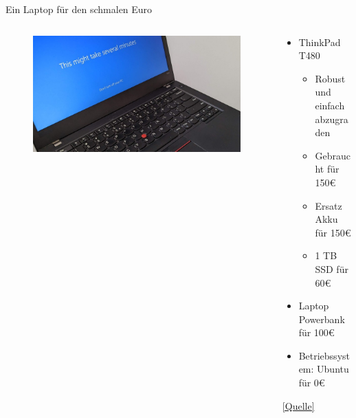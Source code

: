 \documentclass[aspectratio=169,shownotes]{beamer}
\begin{document}
\begin{frame}{Ein Laptop für den schmalen Euro}
    \begin{columns}
        \begin{column}{0.6\textwidth}
            \begin{figure}
                \begin{flushleft}
                    \includegraphics[width=\textwidth,trim={0 0 0 0},clip]{graphics/ThinkPad.jpg}
                \end{flushleft}                
            \end{figure} 
        \end{column}
        \begin{column}{0.4\textwidth}
            \begin{itemize}
                \item ThinkPad T480
                \begin{itemize}
                    \item Robust und einfach abzugraden
                    \item Gebraucht für 150€
                    \item Ersatz Akku für 150€
                    \item 1 TB SSD für 60€
                \end{itemize} 
                \item Laptop Powerbank für 100€
                \item Betriebssystem: Ubuntu für 0€
            \end{itemize}
            \href{https://www.golem.de/news/diy-mein-thinkpad-t480-ist-so-gut-wie-ein-macbook-air-m1-2308-176569.html}{[Quelle]}
        \end{column}
    \end{columns}
\end{frame}
\end{document}
